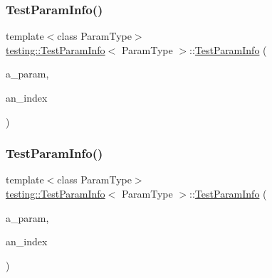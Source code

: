 \subsubsection{\texorpdfstring{TestParamInfo()}{TestParamInfo()}\hspace{0.1cm}{\footnotesize\ttfamily [1/3]}}
{\footnotesize\ttfamily template$<$class Param\+Type$>$ \\
\mbox{\hyperlink{structtesting_1_1_test_param_info}{testing\+::\+Test\+Param\+Info}}$<$ Param\+Type $>$\+::\mbox{\hyperlink{structtesting_1_1_test_param_info}{Test\+Param\+Info}} (\begin{DoxyParamCaption}\item[{const Param\+Type \&}]{a\+\_\+param,  }\item[{size\+\_\+t}]{an\+\_\+index }\end{DoxyParamCaption})\hspace{0.3cm}{\ttfamily [inline]}}

\mbox{\label{structtesting_1_1_test_param_info_aa54199319bcad5a33c8538ecaecb6de5}} 
\subsubsection{\texorpdfstring{TestParamInfo()}{TestParamInfo()}\hspace{0.1cm}{\footnotesize\ttfamily [2/3]}}
{\footnotesize\ttfamily template$<$class Param\+Type$>$ \\
\mbox{\hyperlink{structtesting_1_1_test_param_info}{testing\+::\+Test\+Param\+Info}}$<$ Param\+Type $>$\+::\mbox{\hyperlink{structtesting_1_1_test_param_info}{Test\+Param\+Info}} (\begin{DoxyParamCaption}\item[{const Param\+Type \&}]{a\+\_\+param,  }\item[{size\+\_\+t}]{an\+\_\+index }\end{DoxyParamCaption})\hspace{0.3cm}{\ttfamily [inline]}}

\mbox{\label{structtesting_1_1_test_param_info_aa54199319bcad5a33c8538ecaecb6de5}} 
